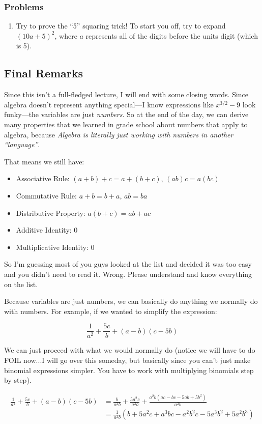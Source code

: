 \subsubsection{Problems}
\begin{enumerate}
\item Try to prove the ``5'' squaring trick! To start you off, try to expand $(10a+5)^2$, where $a$ represents all of the digits before the units digit (which is 5).
\end{enumerate}

\subsection{Final Remarks}
Since this isn't a full-fledged lecture, I will end with some closing words. Since algebra doesn't represent anything special---I know expressions like $x^{3/2}-9$ look funky---the variables are just \textit{numbers}. So at the end of the day, we can derive many properties that we learned in grade school about numbers that apply to algebra, because \textit{Algebra is literally just working with numbers in another ``language''}.

That means we still have:
\begin{itemize}
\item Associative Rule: $(a+b)+c = a+(b+c)$, $(ab)c = a(bc)$
\item Commutative Rule: $a+b=b+a$, $ab=ba$
\item Distributive Property: $ a(b+c) = ab+ac $
\item Additive Identity: 0
\item Multiplicative Identity: 0
\end{itemize}

So I'm guessing most of you guys looked at the list and decided it was too easy and you didn't need to read it.
Wrong. Please understand and know everything on the list.

Because variables are just numbers, we can basically do anything we normally do with numbers. For example, if we wanted to simplify the expression: 

$$\frac{1}{a^2} + \frac{5c}{b} + (a-b)(c-5b)$$

We can just proceed with what we would normally do (notice we will have to do FOIL now...I will go over this someday, but basically since you can't just make binomial expressions simpler. You have to work with multiplying binomials step by step).

\begin{align*}
\frac{1}{a^2} + \frac{5c}{b} + (a-b)(c-5b) &= \frac{b}{a^2b}+\frac{5a^2c}{a^2b}+\frac{a^2b(ac-bc-5ab+5b^2)}{a^2b}\\
&= \frac{1}{a^2b}(b+5a^2c+a^3bc-a^2b^2c-5a^3b^2+5a^2b^3)
\end{align*}

